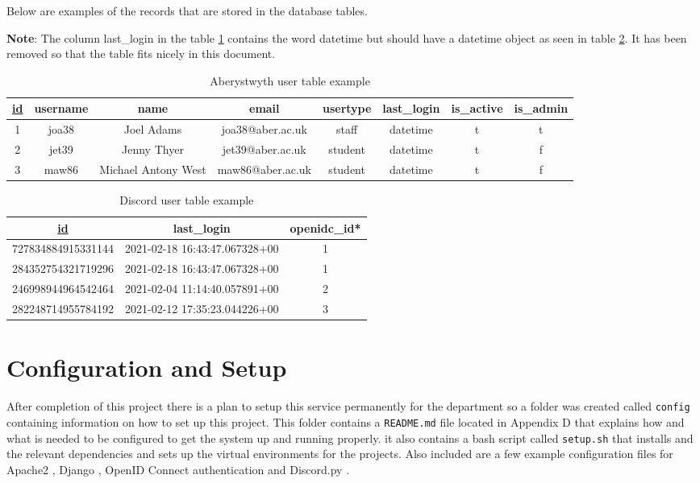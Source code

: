 Below are examples of the records that are stored in the database tables. 

\textbf{Note}: The column last\_login in the table \ref{tab:aber-table} contains the word datetime but should have a datetime object as seen in table \ref{tab:dis-table}. It has been removed so that the table fits nicely in this document.

\begin{table}[H]
	\centering
	\small
	\setlength\tabcolsep{2pt}
	\begin{tabular}{|c|c|c|c|c|c|c|c|}
		\hline
		\underline{id} & username & name & email & usertype & last\_login & is\_active & is\_admin \\
		\hline
		1 & joa38 & Joel Adams & joa38@aber.ac.uk & staff & datetime & t & t \\
		2 & jet39 & Jenny Thyer & jet39@aber.ac.uk & student & datetime & t & f \\
		3 & maw86 & Michael Antony West & maw86@aber.ac.uk & student & datetime & t & f \\
		\hline 
	\end{tabular}
	\caption{Aberystwyth user table example}
	\label{tab:aber-table}
\end{table}

\begin{table}[H]
	\centering
	\small
	\setlength\tabcolsep{2pt}
	\begin{tabular}{|c|c|c|}
		\hline
		\underline{id}                 & last\_login                   & openidc\_id* \\
		\hline
		727834884915331144 & 2021-02-18 16:43:47.067328+00 & 1           \\
		284352754321719296 & 2021-02-18 16:43:47.067328+00 & 1           \\
		246998944964542464 & 2021-02-04 11:14:40.057891+00 & 2           \\
		282248714955784192 & 2021-02-12 17:35:23.044226+00 & 3           \\
		\hline
	\end{tabular}
	\caption{Discord user table example}
	\label{tab:dis-table}
\end{table}

\section{Configuration and Setup}
After completion of this project there is a plan to setup this service permanently for the department so a folder was created called \verb|config| containing information on how to set up this project. This folder contains a \verb|README.md| file located in Appendix D that explains how and what is needed to be configured to get the system up and running properly. it also contains a bash script called \verb|setup.sh| that installs and the relevant dependencies and sets up the virtual environments for the projects. Also included are a few example configuration files for Apache2 \cite{apache2}, Django \cite{Django}, OpenID Connect authentication \cite{OpenID} and Discord.py \cite{discord.py}.

